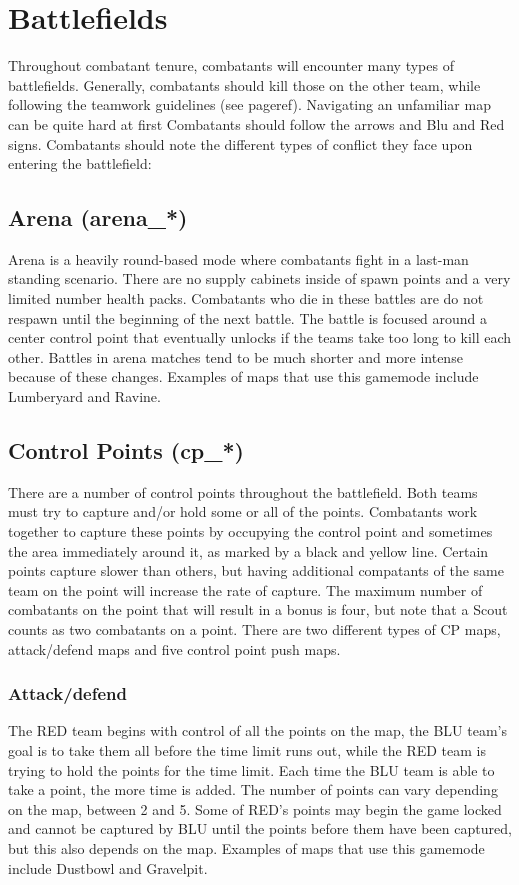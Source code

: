 \section{Battlefields}
Throughout combatant tenure, combatants will encounter many types of battlefields. Generally, combatants should kill those on the other team, while following the teamwork guidelines (see {{pageref}}). Navigating an unfamiliar map can be quite hard at first   Combatants should  follow the arrows and Blu and Red signs. Combatants should note the different types of conflict they face upon entering the battlefield:

\subsection{Arena (arena\_*)}
Arena is a heavily round-based mode where combatants fight in a last-man standing scenario. There are no supply cabinets inside of spawn points and a very limited number health packs.  Combatants who die in these battles are do not respawn until the beginning of the next battle.   The battle is focused around a center control point that eventually unlocks if the teams take too long to kill each other. Battles in arena matches tend to be much shorter and more intense because of these changes. Examples of maps that use this gamemode include Lumberyard and Ravine.

\subsection{Control Points (cp\_*)}
There are a number of control points throughout the battlefield. Both teams must try to capture and/or hold some or all of the points. Combatants work together to capture these points by occupying the control point and sometimes the area immediately around it, as marked by a black and yellow line. Certain points capture slower than others, but having additional compatants of the same team on the point will increase the rate of capture. The maximum number of combatants on the point that will result in a bonus is four, but note that a Scout counts as two combatants on a point. There are two different types of CP maps, attack/defend maps and five control point push maps. 
  
\subsubsection{Attack/defend}
The RED team begins with control of all the points on the map, the BLU team's goal is to take them all before the time limit runs out, while the RED team is trying to hold the points for the time limit. Each time the BLU team is able to take a point, the more time is added. The number of points can vary depending on the map, between 2 and 5. Some of RED's points may begin the game locked and cannot be captured by BLU until the points before them have been captured, but this also depends on the map. Examples of maps that use this gamemode include Dustbowl and Gravelpit.

